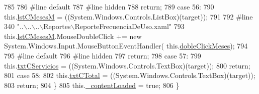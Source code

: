 \begin{DoxyCode}
785             
786 \textcolor{preprocessor}{            #line default}
787 \textcolor{preprocessor}{}\textcolor{preprocessor}{            #line hidden}
788 \textcolor{preprocessor}{}            \textcolor{keywordflow}{return};
789             \textcolor{keywordflow}{case} 56:
790             this.\hyperlink{class_proyecto___integrador__3_1_1_reportes_1_1_reporte_frecuencia_de_uso_ad82bcab9a8b0b8d06f3c9b604da3c3be}{lstCMesesM} = ((System.Windows.Controls.ListBox)(target));
791             
792 \textcolor{preprocessor}{            #line 340 "..\(\backslash\)..\(\backslash\)..\(\backslash\)Reportes\(\backslash\)ReporteFrecuenciaDeUso.xaml"}
793 \textcolor{preprocessor}{}            this.\hyperlink{class_proyecto___integrador__3_1_1_reportes_1_1_reporte_frecuencia_de_uso_ad82bcab9a8b0b8d06f3c9b604da3c3be}{lstCMesesM}.MouseDoubleClick += \textcolor{keyword}{new} System.Windows.Input.MouseButtonEventHandler(
      this.\hyperlink{class_proyecto___integrador__3_1_1_reportes_1_1_reporte_frecuencia_de_uso_a50be2c40af6717361795d2ca8e9b6bf3}{dobleClickMeses});
794             
795 \textcolor{preprocessor}{            #line default}
796 \textcolor{preprocessor}{}\textcolor{preprocessor}{            #line hidden}
797 \textcolor{preprocessor}{}            \textcolor{keywordflow}{return};
798             \textcolor{keywordflow}{case} 57:
799             this.\hyperlink{class_proyecto___integrador__3_1_1_reportes_1_1_reporte_frecuencia_de_uso_a9abdaf17fc6ada9d897e36cf81413c23}{txtCServicios} = ((System.Windows.Controls.TextBox)(target));
800             \textcolor{keywordflow}{return};
801             \textcolor{keywordflow}{case} 58:
802             this.\hyperlink{class_proyecto___integrador__3_1_1_reportes_1_1_reporte_frecuencia_de_uso_abaf1d4ad66a8f620177fc6049ffddcbc}{txtCTotal} = ((System.Windows.Controls.TextBox)(target));
803             \textcolor{keywordflow}{return};
804             \}
805             this.\hyperlink{class_proyecto___integrador__3_1_1_reportes_1_1_reporte_frecuencia_de_uso_aa546d5da9ab7be129b6d02180509f430}{\_contentLoaded} = \textcolor{keyword}{true};
806         \}
\end{DoxyCode}
